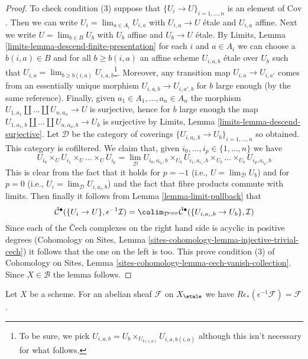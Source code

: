 \begin{proof}
\medskip\noindent
To check condition (3) suppose that $\{U_i \to U\}_{i = 1, \ldots, n}$
is an element of $\text{Cov}$. Then we can write
$U_i = \lim_{a \in A_i} U_{i, a}$ with $U_{i, a} \to U$ \'etale and
$U_{i, a}$ affine.
Next we write $U = \lim_{b \in B} U_b$ with $U_b$ affine and $U_b \to U$
\'etale. By Limits, Lemma \ref{limits-lemma-descend-finite-presentation}
for each $i$ and $a \in A_i$ we can choose a $b(i, a) \in B$
and for all $b \geq b(i, a)$ an affine scheme $U_{i, a, b}$
\'etale over $U_b$ such that
$U_{i, a} = \lim_{b \geq b(i, a)} U_{i, a, b}$\footnote{To be sure, we pick
$U_{i, a, b} = U_b \times_{U_{b(i, a)}} U_{i, a, b(i, a)}$
although this isn't necessary for what follows.}.
Moreover, any transition map $U_{i, a} \to U_{i, a'}$ comes from
an essentially unique morphism $U_{i, a, b} \to U_{i, a', b}$ for $b$
large enough (by the same reference).
Finally, given $a_1 \in A_1, \ldots, a_n \in A_n$ the morphism
$U_{1, a_1} \amalg \ldots \amalg U_{n, a_n} \to U$ is surjective, hence
for $b$ large enough the map
$U_{1, a_1, b} \amalg \ldots \amalg U_{n, a_n, b} \to U_b$
is surjective by Limits, Lemma \ref{limits-lemma-descend-surjective}.
Let $\mathcal{D}$ be the category of coverings
$\{U_{i, a_i, b} \to U_b\}_{i = 1, \ldots, n}$ so obtained. This
category is cofiltered.
We claim that, given $i_0, \ldots, i_p \in \{1, \ldots, n\}$ we have
$$
U_{i_0} \times_U U_{i_1} \times_U \ldots \times_U U_{i_p}
=
\lim_\mathcal{D}
U_{i_0, a_{i_0}, b} \times_{U_b}
U_{i_1, a_{i_1}, b} \times_{U_b} \ldots \times_{U_b} U_{i_p, a_{i_p}, b}
$$
This is clear from the fact that it holds for $p = -1$
(i.e., $U = \lim_\mathcal{D} U_b$) and for $p = 0$
(i.e., $U_i = \lim_\mathcal{D} U_{i, a_i, b}$)
and the fact that fibre products commute with limits.
Then finally it follows from
Lemma \ref{lemma-limit-pullback}
that
$$
\check{\mathcal{C}}^\bullet(\{U_i \to U\}, \epsilon^{-1}\mathcal{I}) =
\colim_{\mathcal{D}^{opp}}
\check{\mathcal{C}}^\bullet(\{U_{i, a_i, b} \to U_b\}, \mathcal{I})
$$
Since each of the {\v C}ech complexes on the right hand side is
acyclic in positive degrees
(Cohomology on Sites, Lemma
\ref{sites-cohomology-lemma-injective-trivial-cech})
it follows that the one on the left is too. This prove condition (3) of
Cohomology on Sites, Lemma \ref{sites-cohomology-lemma-cech-vanish-collection}.
Since $X \in \mathcal{B}$ the lemma follows.
\end{proof}

\begin{lemma}
\label{lemma-relative-comparison}
Let $X$ be a scheme. For an abelian sheaf $\mathcal{F}$ on $X_\etale$
we have $R\epsilon_*(\epsilon^{-1}\mathcal{F}) = \mathcal{F}$.
\end{lemma}

